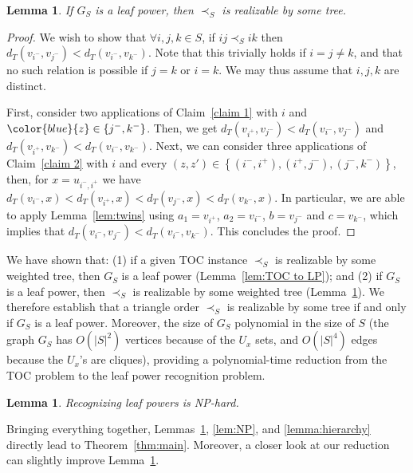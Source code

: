 \documentclass[11pt, letter]{article}
\newcommand{\ml}[1]{{\color{blue}{{#1}}}}
\newtheorem{lemma}[theorem]{Lemma}
\newtheorem{lm}[theorem]{Lemma}
\theoremstyle{remark}
\newcommand{\set}[1]{\left\{#1\right\}}
\begin{document}
\begin{lm}\label{lem:LP to TOC}
    If $G_S$ is a leaf power, then $\prec_S$ is realizable by some tree.
\end{lm}

\begin{proof}
    We wish to show that $\forall i,j,k\in S$, if $ij\prec_S ik$ then $d_T(v_{i^-},v_{j^-})<d_T(v_{i^-},v_{k^-})$.  Note that this trivially holds if $i = j \neq k$, and that no such relation is possible if $j = k$ or $i = k$.  We may thus assume that $i, j, k$ are distinct.
    
    First, consider two applications of Claim~\ref{claim 1} with $i$ and $\ml{z} \in \set{j^-,k^-}$. Then, we get $d_T(v_{i^+},v_{j^-})< d_T(v_{i^-},v_{j^-})$ and $d_T(v_{i^+},v_{k^-})< d_T(v_{i^-},v_{k^-})$. Next, we can consider three applications of Claim~\ref{claim 2} with $i$ 
    and every $(z, z') \in \set{(i^-,i^+),(i^+,j^-),(j^-,k^-)}$, then, for $x=u_{i^-,i^+}$ we have $d_T(v_{i^-},x)<d_T(v_{i^+},x)<d_T(v_{j^-},x)<d_T(v_{k^-},x)$. In particular, we are able to apply Lemma~\ref{lem:twins} using $a_1=v_{i^+}$, $a_2=v_{i^-}$, $b=v_{j^-}$ and $c=v_{k^-}$, which implies that $d_T(v_{i^-},v_{j^-})<d_T(v_{i^-},v_{k^-})$. This concludes the proof.
\end{proof}

We have shown that: (1) if a given TOC instance $\prec_S$ is realizable by some weighted tree, then $G_S$ is a leaf power (Lemma~\ref{lem:TOC to LP}); and (2) if $G_S$ is a leaf power, then $\prec_S$ is realizable by some weighted tree (Lemma~\ref{lem:LP to TOC}).
We therefore establish that a triangle order $\prec_S$ is realizable by some tree if and only if $G_S$ is a leaf power. Moreover, the size of $G_S$ polynomial in the size of $S$ (the graph $G_S$ has $O(|S|^2)$ vertices because of the $U_x$ sets, and $O(|S|^4)$ edges because the $U_x$'s are cliques), providing a polynomial-time reduction from the TOC problem to the leaf power recognition problem.

\begin{lemma}\label{lem:LP-NPhard}
    Recognizing leaf powers is NP-hard.
\end{lemma}

Bringing everything together, Lemmas~\ref{lem:LP-NPhard}, \ref{lem:NP}, and \ref{lemma:hierarchy} directly lead to Theorem~\ref{thm:main}. Moreover, a closer look at our reduction can slightly improve Lemma~\ref{lem:LP-NPhard}.

\unary*
\end{document}
